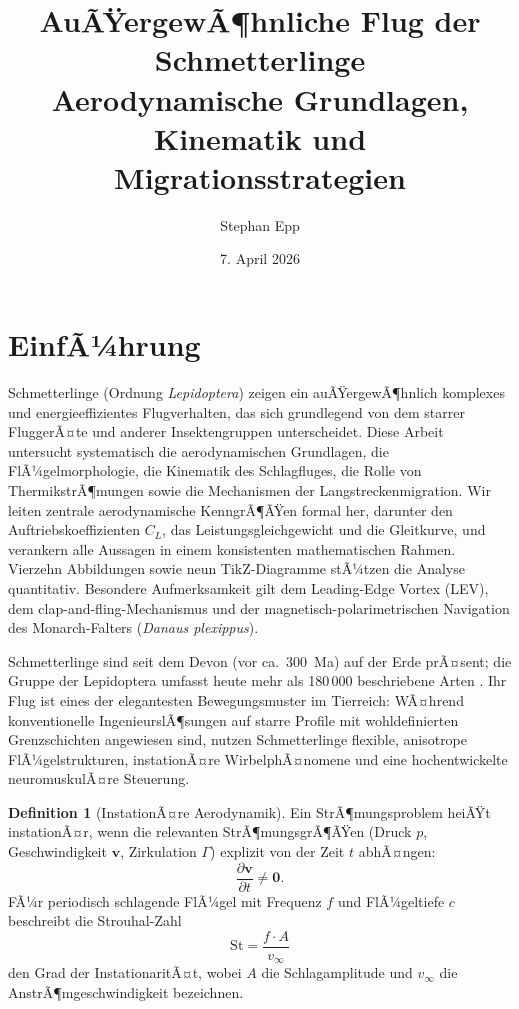 ﻿\documentclass[a4paper,12pt]{article}
\title{\textbf{AuÃŸergewÃ¶hnliche Flug der Schmetterlinge}\\[-0.4em]
	{\large Aerodynamische Grundlagen, Kinematik und Migrationsstrategien}}
\author{Stephan Epp}
\date{7. April 2026}
\theoremstyle{definition}
\newtheorem{definition}{Definition}
\begin{document}
	
	\maketitle
	
	\tableofcontents
	\newpage
	
	\section{EinfÃ¼hrung}
	Schmetterlinge (Ordnung \textit{Lepidoptera}) zeigen ein auÃŸergewÃ¶hnlich komplexes und
	energieeffizientes Flugverhalten, das sich grundlegend von dem starrer FluggerÃ¤te und
	anderer Insektengruppen unterscheidet. Diese Arbeit untersucht systematisch die
	aerodynamischen Grundlagen, die FlÃ¼gelmorphologie, die Kinematik des Schlagfluges, die
	Rolle von ThermikstrÃ¶mungen sowie die Mechanismen der Langstreckenmigration.
	Wir leiten zentrale aerodynamische KenngrÃ¶ÃŸen formal her, darunter den
	Auftriebskoeffizienten $C_L$, das Leistungsgleichgewicht und die Gleitkurve,
	und verankern alle Aussagen in einem konsistenten mathematischen Rahmen.
	Vierzehn Abbildungen sowie neun TikZ-Diagramme stÃ¼tzen die Analyse quantitativ.
	Besondere Aufmerksamkeit gilt dem Leading-Edge Vortex (LEV), dem clap-and-fling-Mechanismus
	und der magnetisch-polarimetrischen Navigation des Monarch-Falters (\textit{Danaus plexippus}).
	
	Schmetterlinge sind seit dem Devon (vor ca.\ \SI{300}{Ma}) auf der Erde prÃ¤sent;
	die Gruppe der Lepidoptera umfasst heute mehr als 180\,000 beschriebene Arten
	\cite{grimaldi2005evolution}.
	Ihr Flug ist eines der elegantesten Bewegungsmuster im Tierreich:
	WÃ¤hrend konventionelle IngenieurslÃ¶sungen auf starre Profile mit wohldefinierten
	Grenzschichten angewiesen sind, nutzen Schmetterlinge flexible, anisotrope FlÃ¼gelstrukturen,
	instationÃ¤re WirbelphÃ¤nomene und eine hochentwickelte neuromuskulÃ¤re Steuerung.
	
	\begin{definition}[InstationÃ¤re Aerodynamik]
		Ein StrÃ¶mungsproblem heiÃŸt instationÃ¤r, wenn die relevanten StrÃ¶mungsgrÃ¶ÃŸen
		(Druck $p$, Geschwindigkeit $\boldsymbol{v}$, Zirkulation $\Gamma$) explizit von
		der Zeit $t$ abhÃ¤ngen:
		\[
		\frac{\partial \boldsymbol{v}}{\partial t} \neq \boldsymbol{0}.
		\]
		FÃ¼r periodisch schlagende FlÃ¼gel mit Frequenz $f$ und FlÃ¼geltiefe $c$ beschreibt
		die Strouhal-Zahl
		\[
		\mathrm{St} = \frac{f \cdot A}{v_\infty}
		\]
		den Grad der InstationaritÃ¤t, wobei $A$ die Schlagamplitude und $v_\infty$ die
		AnstrÃ¶mgeschwin\-digkeit bezeichnen.
	\end{definition}
	
\end{document}
